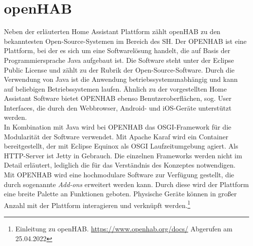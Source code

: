 \section{openHAB}
\label{sec:openhab} 
    Neben der erläuterten Home Assistant Plattform zählt openHAB zu den bekanntesten Open-Source-Systemen im 
    Bereich des \acl{SH}. Der \ac{OPENHAB} ist eine Plattform, bei der es sich um eine 
    Softwarelösung handelt, die auf Basis der Programmiersprache Java aufgebaut ist. Die Software steht unter 
    der Eclipse Public License und zählt zu der Rubrik der Open-Source-Software. Durch die Verwendung 
    von Java ist die Anwendung betriebssystemunabhängig und kann auf beliebigen Betriebssystemen laufen. 
    Ähnlich zu der vorgestellten Home Assistant Software bietet \acs{OPENHAB} ebenso Benutzeroberflächen, sog. User Interfaces, die durch 
    den Webbrowser, Android- und iOS-Geräte unterstützt werden. 
    \\
    \linebreak
    In Kombination mit Java wird bei \acs{OPENHAB} das \ac{OSGI}-Framework für die Modularität der Software verwendet. Mit Apache 
    Karaf wird ein Container bereitgestellt, der mit Eclipse Equinox als \acs{OSGI} Laufzeitumgebung agiert. Als 
    \acs{HTTP}-Server ist Jetty in Gebrauch. Die einzelnen Frameworks werden nicht im Detail erläutert, lediglich die für das 
    Verständnis des Konzeptes notwendigen.
    \\
    \linebreak
    Mit \acs{OPENHAB} wird eine hochmodulare Software zur Verfügung gestellt, die durch sogenannte \textit{Add-ons} erweitert 
    werden kann. Durch diese wird der Plattform eine breite Palette an Funktionen geboten. Physische Geräte können in 
    großer Anzahl mit der Plattform interagieren und verknüpft werden.\footnote{Einleitung zu openHAB. \url{https://www.openhab.org/docs/} Abgerufen am 25.04.2022}
